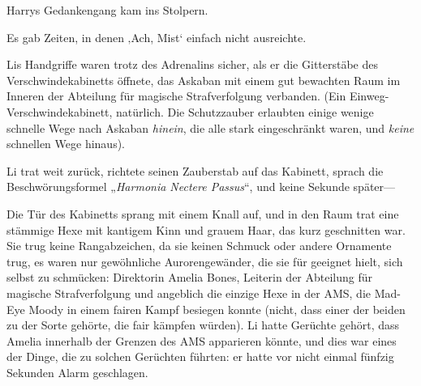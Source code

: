 Harrys Gedankengang kam ins Stolpern.

Es gab Zeiten, in denen ‚Ach, Mist‘ einfach nicht ausreichte.

\later

Lis Handgriffe waren trotz des Adrenalins sicher, als er die Gitterstäbe des Verschwindekabinetts öffnete, das Askaban mit einem gut bewachten Raum im Inneren der Abteilung für magische Strafverfolgung verbanden. (Ein Einweg-Verschwindekabinett, natürlich. Die Schutzzauber erlaubten einige wenige schnelle Wege nach Askaban \emph{hinein}, die alle stark eingeschränkt waren, und \emph{keine} schnellen Wege hinaus).

Li trat weit zurück, richtete seinen Zauberstab auf das Kabinett, sprach die Beschwörungsformel „\emph{Harmonia Nectere Passus}“, und keine Sekunde später—

Die Tür des Kabinetts sprang mit einem Knall auf, und in den Raum trat eine stämmige Hexe mit kantigem Kinn und grauem Haar, das kurz geschnitten war. Sie trug keine Rangabzeichen, da sie keinen Schmuck oder andere Ornamente trug, es waren nur gewöhnliche Aurorengewänder, die sie für geeignet hielt, sich selbst zu schmücken: Direktorin Amelia Bones, Leiterin der Abteilung für magische Strafverfolgung und angeblich die einzige Hexe in der AMS, die Mad-Eye Moody in einem fairen Kampf besiegen konnte (nicht, dass einer der beiden zu der Sorte gehörte, die fair kämpfen würden). Li hatte Gerüchte gehört, dass Amelia innerhalb der Grenzen des AMS apparieren könnte, und dies war eines der Dinge, die zu solchen Gerüchten führten: er hatte vor nicht einmal fünfzig Sekunden Alarm geschlagen.

